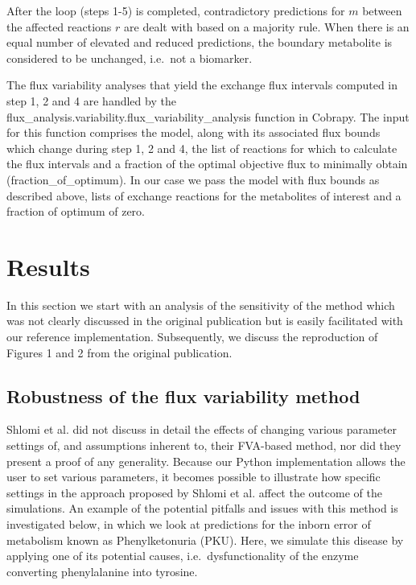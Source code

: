 \documentclass[10pt,a4paper,onecolumn]{article}
\begin{document}
After the loop (steps 1-5) is completed, contradictory predictions for
\(m\) between the affected reactions \(r\) are dealt with based on a
majority rule. When there is an equal number of elevated and reduced
predictions, the boundary metabolite is considered to be unchanged,
i.e.~not a biomarker.

The flux variability analyses that yield the exchange flux intervals
computed in step 1, 2 and 4 are handled by the
flux\_analysis.variability.flux\_variability\_analysis function in
Cobrapy. The input for this function comprises the model, along with its
associated flux bounds which change during step 1, 2 and 4, the list of
reactions for which to calculate the flux intervals and a fraction of
the optimal objective flux to minimally obtain (fraction\_of\_optimum).
In our case we pass the model with flux bounds as described above, lists
of exchange reactions for the metabolites of interest and a fraction of
optimum of zero.

\section{Results}\label{results}

In this section we start with an analysis of the sensitivity of the
method which was not clearly discussed in the original publication but
is easily facilitated with our reference implementation. Subsequently,
we discuss the reproduction of Figures 1 and 2 from the original
publication.

\subsection{Robustness of the flux variability
method}\label{robustness-of-the-flux-variability-method}

Shlomi et al. did not discuss in detail the effects of changing various
parameter settings of, and assumptions inherent to, their FVA-based
method, nor did they present a proof of any generality. Because our
Python implementation allows the user to set various parameters, it
becomes possible to illustrate how specific settings in the approach
proposed by Shlomi et al. affect the outcome of the simulations. An
example of the potential pitfalls and issues with this method is
investigated below, in which we look at predictions for the inborn error
of metabolism known as Phenylketonuria (PKU). Here, we simulate this
disease by applying one of its potential causes, i.e.~dysfunctionality
of the enzyme converting phenylalanine into tyrosine.
\end{document}
